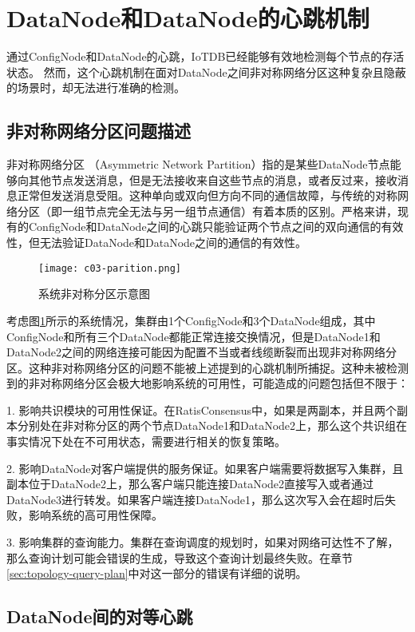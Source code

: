 \section{DataNode和DataNode的心跳机制}


通过ConfigNode和DataNode的心跳，IoTDB已经能够有效地检测每个节点的存活状态。
然而，这个心跳机制在面对DataNode之间非对称网络分区这种复杂且隐蔽的场景时，却无法进行准确的检测。

\subsection{非对称网络分区问题描述}
非对称网络分区 （Asymmetric Network Partition）指的是某些DataNode节点能够向其他节点发送消息，但是无法接收来自这些节点的消息，或者反过来，接收消息正常但发送消息受阻。这种单向或双向但方向不同的通信故障，与传统的对称网络分区（即一组节点完全无法与另一组节点通信）有着本质的区别。严格来讲，现有的ConfigNode和DataNode之间的心跳只能验证两个节点之间的双向通信的有效性，但无法验证DataNode和DataNode之间的通信的有效性。

\begin{figure}
  \centering
  \texttt{[image: c03-parition.png]}
  \caption{系统非对称分区示意图}
  \label{fig:c03-partition}
\end{figure}

考虑图\ref{fig:c03-partition}所示的系统情况，集群由1个ConfigNode和3个DataNode组成，其中ConfigNode和所有三个DataNode都能正常连接交换情况，但是DataNode1和DataNode2之间的网络连接可能因为配置不当或者线缆断裂而出现非对称网络分区。这种非对称网络分区的问题不能被上述提到的心跳机制所捕捉。这种未被检测到的非对称网络分区会极大地影响系统的可用性，可能造成的问题包括但不限于：

1. 影响共识模块的可用性保证。在RatisConsensus中，如果是两副本，并且两个副本分别处在非对称分区的两个节点DataNode1和DataNode2上，那么这个共识组在事实情况下处在不可用状态，需要进行相关的恢复策略。

2. 影响DataNode对客户端提供的服务保证。如果客户端需要将数据写入集群，且副本位于DataNode2上，那么客户端只能连接DataNode2直接写入或者通过DataNode3进行转发。如果客户端连接DataNode1，那么这次写入会在超时后失败，影响系统的高可用性保障。

3. 影响集群的查询能力。集群在查询调度的规划时，如果对网络可达性不了解，那么查询计划可能会错误的生成，导致这个查询计划最终失败。在章节\ref{sec:topology-query-plan}中对这一部分的错误有详细的说明。

\subsection{DataNode间的对等心跳}\label{sec:datanode-intra-heartbeat}

